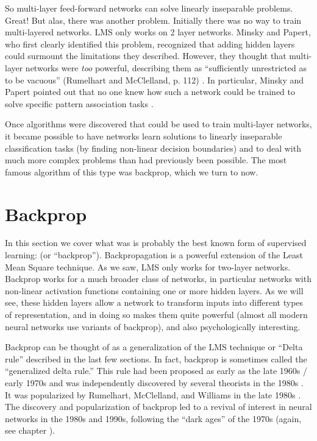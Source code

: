 So multi-layer feed-forward networks can solve linearly inseparable problems. Great!  But alas, there was another  problem. Initially there was no way to train multi-layered networks. LMS only works on 2 layer networks. Minsky and Papert, who first clearly identified this problem, recognized that adding hidden layers could surmount the limitations they described. However, they thought that multi-layer networks were {\em too} powerful, describing them as ``sufficiently unrestricted as to be vacuous'' (Rumelhart and McClelland, p. 112) \cite{rumelhart1986parallel}. In particular, Minsky and Papert pointed out that no one knew how such a network could be trained to solve specific pattern association tasks \cite{minsky1969perceptrons}.

Once algorithms were discovered that could be used to train multi-layer networks, it became possible to have networks learn solutions to linearly inseparable classification tasks (by finding non-linear decision boundaries) and to deal with much more complex problems than had previously been possible. The most famous algorithm of this type was backprop, which we turn to now.

\section{Backprop}\label{backprop}

In this section we cover what was is probably the best known form of supervised learning:  (or ``backprop''). Backpropagation is a powerful extension of the Least Mean Square  technique. As we saw, LMS only works for two-layer networks. Backprop works for a much broader class of networks, in particular networks with non-linear activation functions containing one or more hidden layers. As we will see, these hidden layers allow a network to transform inputs into different types of representation, and in doing so makes them quite powerful (almost all modern neural networks use variants of backprop), and also psychologically interesting. 

Backprop can be thought of as a generalization of the LMS technique or ``Delta rule'' described in the last few sections. In fact, backprop is sometimes called the ``generalized delta rule.'' This rule had been proposed as early as the late 1960s / early 1970s \cite{bryson1969applied, werbos1974beyond} and was independently discovered by several theorists in the 1980s \cite{le1986learning, parker1985learning}. It was popularized by Rumelhart, McClelland, and Williams in the late 1980s \cite{rumelhart1986parallel}. The discovery and popularization of backprop led to a revival of interest in neural networks in the 1980s and 1990s, following the ``dark ages'' of the 1970s (again, see chapter ).


